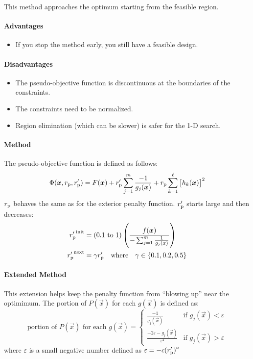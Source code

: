 \documentclass{article}
\begin{document}
This method approaches the optimum starting from the feasible region.

\paragraph{Advantages}
\begin{itemize}
\item If you stop the method early, you still have a feasible design.
\end{itemize}

\paragraph{Disadvantages}
\begin{itemize}
\item The pseudo-objective function is discontinuous at the boundaries of the constraints.
\item The constraints need to be normalized.
\item Region elimination (which can be slower) is safer for the 1-D search.
\end{itemize}

\paragraph{Method}
The pseudo-objective function is defined as follows:
\[\Phi(\bm{x}, r_{\mathrm{p}}, r'_{\mathrm{p}})
= F(\bm{x}) + r'_{\mathrm{p}} \sum_{j=1}^m{\frac{-1}{g_j(\bm{x})}}
+ r_{\mathrm{p}} \sum_{k=1}^\ell{\left[h_k(\bm{x})\right]}^2\]
\(r_{\mathrm{p}}\) behaves the same as for the exterior penalty function. \(r'_{\mathrm{p}}\) starts large and then decreases:
\begin{align*}
  {r'_{\mathrm{p}}}^\textrm{init} &= (0.1 \textrm{ to } 1) \left(\frac{f(\bm{x})}{-\sum_{j=1}^m{\frac{1}{g_j(\bm{x})}}}\right) \\
  {r'_{\mathrm{p}}}^\textrm{next} &= \gamma r'_{\mathrm{p}} \quad \textrm{where} \quad \gamma \in \{0.1, 0.2, 0.5\}
\end{align*}

\paragraph{Extended Method}
This extension helps keep the penalty function from ``blowing up'' near the optimimum. The portion
of \(P(\vec{x})\) for each \(g(\vec{x})\) is defined as:
\[\textrm{portion of } P(\vec{x}) \textrm{ for each } g(\vec{x}) =
\begin{cases}
  \frac{-1}{g_j(\vec{x})} & \textrm{if } g_j(\vec{x}) < \varepsilon \\
  \frac{-2\varepsilon - g_j(\vec{x})}{\varepsilon^2} & \textrm{if } g_j(\vec{x}) > \varepsilon
\end{cases}\] where \(\varepsilon\) is a small negative number defined as
\(\varepsilon = -c {(r'_{\mathrm{p}})}^a\)
\end{document}
